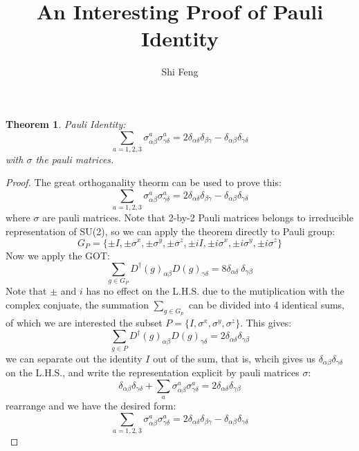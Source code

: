 \documentclass[11pt]{article}
\title{An Interesting Proof of Pauli Identity}
\author{Shi Feng}
\date{}
\newtheorem{thm}{Theorem}
\theoremstyle{remark}
\theoremstyle{definition}
\begin{document}
\maketitle
\begin{thm}
	Pauli Identity:	
\begin{equation}
	\sum_{a = 1,2,3}\sigma_{\alpha\beta}^a\sigma_{\gamma\delta}^a = 2\delta_{\alpha\delta}\delta_{\beta\gamma} -\delta_{\alpha\beta}\delta_{\gamma\delta} 
\end{equation}
with $\sigma$ the pauli matrices.
\end{thm}
\begin{proof}
The great orthoganality theorm can be used to prove this:
\begin{equation}
	\sum_{a = 1,2,3}\sigma_{\alpha\beta}^a\sigma_{\gamma\delta}^a = 2\delta_{\alpha\delta}\delta_{\beta\gamma} -\delta_{\alpha\beta}\delta_{\gamma\delta} 
\end{equation}
where $\sigma$ are pauli matrices. Note that 2-by-2 Pauli matrices belongs to irreducible representation of SU(2), so we can apply the theorem directly to Pauli group:
\begin{equation}
	G_{P} = \{ \pm I, \pm \sigma^x, \pm \sigma^y, \pm \sigma^z, \pm iI, \pm i\sigma^x, \pm i\sigma^y, \pm i\sigma^z \}
\end{equation}
Now we apply the GOT:
\begin{equation}
	\sum_{g\in G_P}D^\dagger(g)_{\alpha\beta}D(g)_{\gamma\delta} = 8 \delta_{\alpha\delta}\:\delta_{\gamma\beta} 
\end{equation}
Note that $\pm$ and $i$ has no effect on the L.H.S. due to the mutiplication with the complex conjuate, the summation $\sum_{g\in G_p}$ can be divided into 4 identical sums, of which we are interested the subset $P = \{I, \sigma^x, \sigma^y, \sigma^z\}$. This gives:
\begin{equation}
	\sum_{g\in P} D^\dagger(g)_{\alpha\beta}D(g)_{\gamma\delta} = 2\delta_{\alpha\delta}\delta_{\gamma\beta} 
\end{equation}
we can separate out the identity $I$ out of the sum, that is, whcih gives us  $\delta_{\alpha\beta}\delta_{\gamma\delta}$ on the L.H.S., and write the representation explicit by pauli matrices $\sigma$:
\begin{equation}
	\delta_{\alpha\beta}\delta_{\gamma\delta} + \sum_{a}\sigma_{\alpha\beta}^a \sigma_{\gamma\delta}^a = 2\delta_{\alpha\delta}\delta_{\gamma\beta}
\end{equation}
rearrange and we have the desired form:
\begin{equation}
	\sum_{a = 1,2,3}\sigma_{\alpha\beta}^a\sigma_{\gamma\delta}^a = 2\delta_{\alpha\delta}\delta_{\beta\gamma} -\delta_{\alpha\beta}\delta_{\gamma\delta} 
\end{equation}

\end{proof}


%
\end{document}
